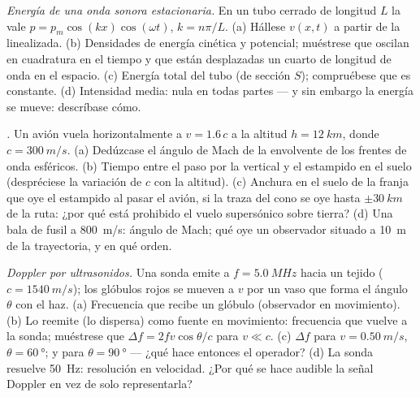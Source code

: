 \begin{exercise}[$\star\star\star$]\label{exo:b2:sound-waves:10}
\emph{Energía de una onda sonora estacionaria.} En un tubo cerrado de longitud $L$
la  vale $p = p_m\cos(kx)\cos(\omega t)$, $k = n\pi/L$. (a) Hállese $v(x,
t)$ a partir de la  linealizada. (b) Densidades de
energía cinética y potencial; muéstrese que oscilan en cuadratura en el
tiempo y que están desplazadas un cuarto de longitud de onda en el
espacio. (c) Energía total del tubo (de sección $S$); compruébese que es
constante. (d) Intensidad media: nula en todas partes --- y sin embargo la
energía se mueve: descríbase cómo.
\end{exercise}

\begin{exercise}[$\star\star\star$]\label{exo:b2:sound-waves:11}
\emph{.} Un avión vuela horizontalmente a $v = 1.6\,c$ a la
altitud $h = \qty{12}{km}$, donde $c = \qty{300}{m/s}$. (a) Dedúzcase el ángulo
de Mach de la envolvente de los frentes de onda esféricos. (b) Tiempo entre
el paso por la vertical y el estampido en el suelo (despréciese la
variación de $c$ con la altitud). (c) Anchura en el suelo de la franja que
oye el estampido al pasar el avión, si la traza del cono se oye hasta
$\pm\qty{30}{km}$ de la ruta: ¿por qué está prohibido el vuelo supersónico
sobre tierra? (d) Una bala de fusil a \qty{800}{m/s}: ángulo de Mach; qué
oye un observador situado a \qty{10}{m} de la trayectoria, y en qué orden.
\end{exercise}

\begin{exercise}[$\star\star\star$]\label{exo:b2:sound-waves:12}
\emph{Doppler por ultrasonidos.} Una sonda emite a $f = \qty{5.0}{MHz}$ hacia
un tejido ($c = \qty{1540}{m/s}$); los glóbulos rojos se mueven a $v$ por un
vaso que forma el ángulo $\theta$ con el haz. (a) Frecuencia que recibe un
glóbulo (observador en movimiento). (b) Lo reemite (lo dispersa) como fuente en movimiento:
frecuencia que vuelve a la sonda; muéstrese que $\Delta f = 2fv\cos\theta/c$ para $v \ll c$. (c)
$\Delta f$ para $v = \qty{0.50}{m/s}$, $\theta = \qty{60}{\degree}$; y para $\theta = \qty{90}{\degree}$
--- ¿qué hace entonces el operador? (d) La sonda resuelve \qty{50}{Hz}:
resolución en velocidad. ¿Por qué se hace audible la señal Doppler en vez
de solo representarla?
\end{exercise}


